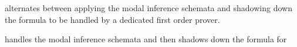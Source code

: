 

alternates between
applying the modal inference schemata and shadowing down the formula to be handled
by a dedicated first order prover.


handles the
modal inference schemata and then shadows down the formula for

\begin{comment}
To handle reasoning within \CEC\, we utilize a quantified modal logic
theorem prover, \textsf{ShadowProver}, first presented in
\cite{nsg_sb_dde_ijcai,uncertaintyized_cognitive_calculus}.\footnote{The
  prover is available in both Java and Common Lisp and can be obtained
  at: \url{https://github.com/naveensundarg/prover}. The underlying
  first-order prover is SNARK, available at:
  \url{http://www.ai.sri.com/~stickel/snark.html}.}  The prover works
by utilizing a technique called \textbf{shadowing} to achieve speed
without sacrificing consistency in the system.  Shadowing is a
syntactic operation that converts any modal formula (or a set of
formulae) $\phi$ to a non-modal formula $\mathsf{shadow}[\phi]$ by replacing atomic
modal sub-formuale with propositional atoms.


The prover can be equipped
with multiple sets of inference schemes $\rho^p_{q}$, where
$q\in\mathbb{N}$ denotes the degree of the schemes (e.g. $0$ for
propositional schemes, $1$ for first-order quantifier schemes, etc.)
and $p\in\{0,1\}$ denotes the modality of the schemes. For example, pure
propositional logic and first-order schemes are given by $\rho^0_{0}$
and $\rho^0_{1}$, while modal
propositional or modal first-order schemas are given by $\rho^1_{0}$ and
$\rho^1_{1}$.

The core theory-of-mind reasoning is performed through a quantified modal logic theorem prover, \textsf{ShadowProver}, using a technique called shadowing to achieve speed without sacrificing consistency in the system. While describing the details of the reasoner are beyond the scope here, we give a brief overview below.

 We use a different approach, in which we alternate between calling a first-order theorem prover and applying modal inference schemata. When we call the first-order prover, all modal atoms are converted into propositional atoms (i.e., shadowing), to prevent substitution into modal contexts. This approach achieves speed without sacrificing consistency.
\end{comment}